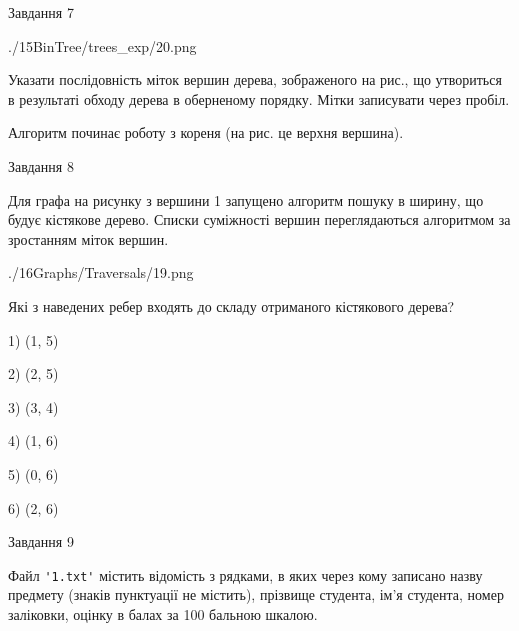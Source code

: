 \documentclass[12pt, ukrainian]{article}
\def\code#1{\Verb!#1!}
\begin{document}
{\vspace{10mm}\par

\newpage
\begin{minipage}[t]{9.7cm}
               
{\begin{center}Завдання {7}\end{center}}
\vspace{-6mm}

\begin{center}
	{./15BinTree/trees_exp/20.png}
\end{center}
Указати послідовність міток вершин дерева, зображеного на рис., що утвориться в результаті обходу дерева в оберненому порядку. Мітки записувати через пробіл.\par Алгоритм починає роботу з кореня (на рис. це верхня вершина).\par

\end{minipage}
\vline \hspace{8mm}
\begin{minipage}[t]{8.0cm}
               
{\begin{center}Завдання {8}\end{center}}
\vspace{-6mm}
Для графа на рисунку з вершини 1 запущено алгоритм пошуку в ширину, що будує кістякове дерево. Списки суміжності вершин переглядаються алгоритмом за зростанням міток вершин.\par
\begin{center}
	{./16Graphs/Traversals/19.png}
\end{center}
\par Які з наведених ребер входять до складу отриманого кістякового дерева?\par
1) (1, 5)\par
2) (2, 5)\par
3) (3, 4)\par
4) (1, 6)\par
5) (0, 6)\par
6) (2, 6)\par
{\vskip 15pt} \par

\end{minipage}

               
{\begin{center}Завдання {9}\end{center}}
\vspace{-6mm}
Файл \code{'1.txt'} містить відомість з рядками, в яких через кому записа\-но назву предмету (знаків пунктуації не містить), прізвище студента, ім'я студента, номер залі\-ков\-ки, оцінку в балах за 100 бальною шкалою.

}
\end{document}
